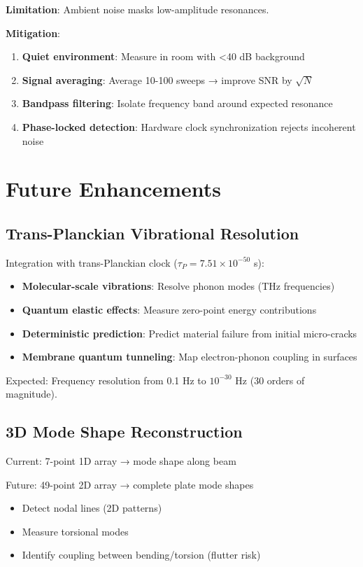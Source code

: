 \documentclass[12pt,a4paper]{article}
\begin{document}
\textbf{Limitation}: Ambient noise masks low-amplitude resonances.

\textbf{Mitigation}:
\begin{enumerate}
\item \textbf{Quiet environment}: Measure in room with <40 dB background
\item \textbf{Signal averaging}: Average 10-100 sweeps → improve SNR by $\sqrt{N}$
\item \textbf{Bandpass filtering}: Isolate frequency band around expected resonance
\item \textbf{Phase-locked detection}: Hardware clock synchronization rejects incoherent noise
\end{enumerate}

\section{Future Enhancements}

\subsection{Trans-Planckian Vibrational Resolution}

Integration with trans-Planckian clock ($\tau_P = 7.51 \times 10^{-50}$ s):

\begin{itemize}
\item \textbf{Molecular-scale vibrations}: Resolve phonon modes (THz frequencies)
\item \textbf{Quantum elastic effects}: Measure zero-point energy contributions
\item \textbf{Deterministic prediction}: Predict material failure from initial micro-cracks
\item \textbf{Membrane quantum tunneling}: Map electron-phonon coupling in surfaces
\end{itemize}

Expected: Frequency resolution from 0.1 Hz to $10^{-30}$ Hz (30 orders of magnitude).

\subsection{3D Mode Shape Reconstruction}

Current: 7-point 1D array → mode shape along beam

Future: 49-point 2D array → complete plate mode shapes
\begin{itemize}
\item Detect nodal lines (2D patterns)
\item Measure torsional modes
\item Identify coupling between bending/torsion (flutter risk)
\end{itemize}
\end{document}
